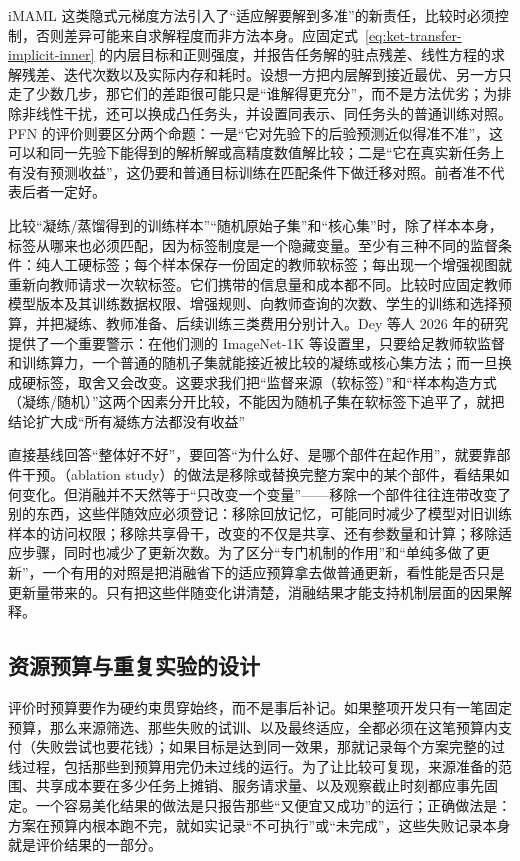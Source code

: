iMAML 这类隐式元梯度方法引入了“适应解要解到多准”的新责任，比较时必须控制，否则差异可能来自求解程度而非方法本身。应固定式~\eqref{eq:ket-transfer-implicit-inner} 的内层目标和正则强度，并报告任务解的驻点残差、线性方程的求解残差、迭代次数以及实际内存和耗时。设想一方把内层解到接近最优、另一方只走了少数几步，那它们的差距很可能只是“谁解得更充分”，而不是方法优劣；为排除非线性干扰，还可以换成凸任务头，并设置同表示、同任务头的普通训练对照。PFN 的评价则要区分两个命题：一是“它对先验下的后验预测近似得准不准”，这可以和同一先验下能得到的解析解或高精度数值解比较；二是“它在真实新任务上有没有预测收益”，这仍要和普通目标训练在匹配条件下做迁移对照。前者准不代表后者一定好。

比较“凝练/蒸馏得到的训练样本”“随机原始子集”和“核心集”时，除了样本本身，标签从哪来也必须匹配，因为标签制度是一个隐藏变量。至少有三种不同的监督条件：纯人工硬标签；每个样本保存一份固定的教师软标签；每出现一个增强视图就重新向教师请求一次软标签。它们携带的信息量和成本都不同。比较时应固定教师模型版本及其训练数据权限、增强规则、向教师查询的次数、学生的训练和选择预算，并把凝练、教师准备、后续训练三类费用分别计入。Dey 等人 2026 年的研究提供了一个重要警示：在他们测的 ImageNet-1K 等设置里，只要给足教师软监督和训练算力，一个普通的随机子集就能接近被比较的凝练或核心集方法；而一旦换成硬标签，取舍又会改变。这要求我们把“监督来源（软标签）”和“样本构造方式（凝练/随机）”这两个因素分开比较，不能因为随机子集在软标签下追平了，就把结论扩大成“所有凝练方法都没有收益”

直接基线回答“整体好不好”，要回答“为什么好、是哪个部件在起作用”，就要靠部件干预。（ablation study）的做法是移除或替换完整方案中的某个部件，看结果如何变化。但消融并不天然等于“只改变一个变量”——移除一个部件往往连带改变了别的东西，这些伴随效应必须登记：移除回放记忆，可能同时减少了模型对旧训练样本的访问权限；移除共享骨干，改变的不仅是共享、还有参数量和计算；移除适应步骤，同时也减少了更新次数。为了区分“专门机制的作用”和“单纯多做了更新”，一个有用的对照是把消融省下的适应预算拿去做普通更新，看性能是否只是更新量带来的。只有把这些伴随变化讲清楚，消融结果才能支持机制层面的因果解释。

\subsection{资源预算与重复实验的设计}
\label{sec:ket-evaluation-repeats}

评价时预算要作为硬约束贯穿始终，而不是事后补记。如果整项开发只有一笔固定预算，那么来源筛选、那些失败的试训、以及最终适应，全都必须在这笔预算内支付（失败尝试也要花钱）；如果目标是达到同一效果，那就记录每个方案完整的过线过程，包括那些到预算用完仍未过线的运行。为了让比较可复现，来源准备的范围、共享成本要在多少任务上摊销、服务请求量、以及观察截止时刻都应事先固定。一个容易美化结果的做法是只报告那些“又便宜又成功”的运行；正确做法是：方案在预算内根本跑不完，就如实记录“不可执行”或“未完成”，这些失败记录本身就是评价结果的一部分。

